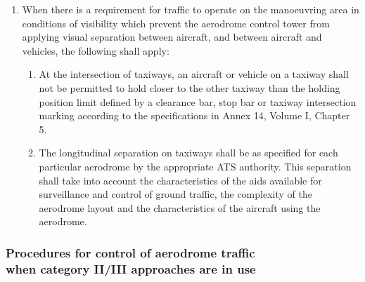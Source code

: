 \documentclass[../main.tex]{subfiles}
\begin{document}
    \begin{enumerate}
        \item When there is a requirement for traffic to operate on the manoeuvring area in conditions of visibility which prevent the aerodrome control tower from applying visual separation between aircraft, and between aircraft and vehicles, the following shall apply:

        \begin{enumerate}
            \item At the intersection of taxiways, an aircraft or vehicle on a taxiway shall not be permitted to hold closer to the other taxiway than the holding position limit defined by a clearance bar, stop bar or taxiway intersection marking according to the specifications in Annex 14, Volume I, Chapter 5.
            \item The longitudinal separation on taxiways shall be as specified for each particular aerodrome by the appropriate ATS authority. This separation shall take into account the characteristics of the aids available for surveillance and control of ground traffic, the complexity of the aerodrome layout and the characteristics of the aircraft using the aerodrome.
        \end{enumerate}

    \end{enumerate}

    \subsubsection[Procedures for control of aerodrome traffic when category II/III approaches are in use]{Procedures for control of aerodrome traffic \\ when category II/III approaches are in use} \label{7.12.2}
\end{document}
